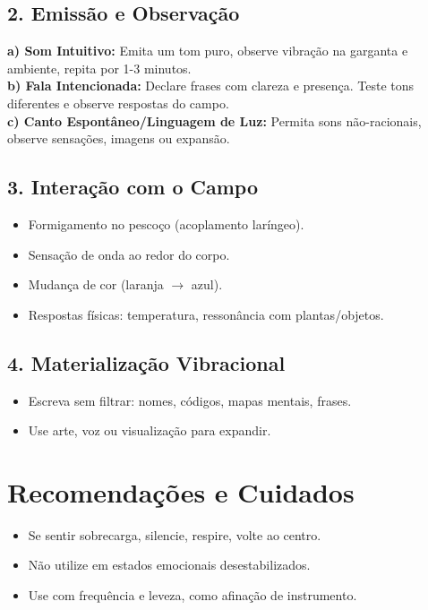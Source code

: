 \documentclass[12pt]{article}
\begin{document}
\subsection*{2. Emissão e Observação}
\textbf{a) Som Intuitivo:} Emita um tom puro, observe vibração na garganta e ambiente, repita por 1-3 minutos.\\
\textbf{b) Fala Intencionada:} Declare frases com clareza e presença. Teste tons diferentes e observe respostas do campo.\\
\textbf{c) Canto Espontâneo/Linguagem de Luz:} Permita sons não-racionais, observe sensações, imagens ou expansão.

\subsection*{3. Interação com o Campo}
\begin{itemize}
    \item Formigamento no pescoço (acoplamento laríngeo).
    \item Sensação de onda ao redor do corpo.
    \item Mudança de cor (laranja $\rightarrow$ azul).
    \item Respostas físicas: temperatura, ressonância com plantas/objetos.
\end{itemize}

\subsection*{4. Materialização Vibracional}
\begin{itemize}
    \item Escreva sem filtrar: nomes, códigos, mapas mentais, frases.
    \item Use arte, voz ou visualização para expandir.
\end{itemize}

\section*{Recomendações e Cuidados}
\begin{itemize}
    \item Se sentir sobrecarga, silencie, respire, volte ao centro.
    \item Não utilize em estados emocionais desestabilizados.
    \item Use com frequência e leveza, como afinação de instrumento.
\end{itemize}
\end{document}
